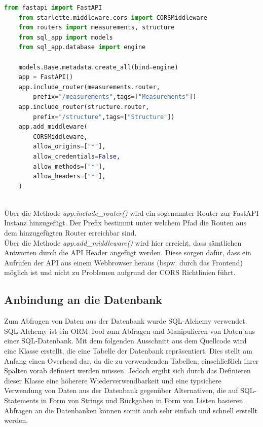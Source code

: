 \begin{lstlisting}[language={Python}, caption={Aufbau der API}, captionpos=b, label={fig:pythonAPI}]
    from fastapi import FastAPI
    from starlette.middleware.cors import CORSMiddleware
    from routers import measurements, structure
    from sql_app import models
    from sql_app.database import engine
    
    models.Base.metadata.create_all(bind=engine)
    app = FastAPI()
    app.include_router(measurements.router, 
        prefix="/measurements",tags=["Measurements"])
    app.include_router(structure.router, 
        prefix="/structure",tags=["Structure"])
    app.add_middleware(
        CORSMiddleware,
        allow_origins=["*"],
        allow_credentials=False,
        allow_methods=["*"],
        allow_headers=["*"],
    )
\end{lstlisting}~\\
Über die Methode \textit{app.include\_router()} wird ein sogenannter Router zur FastAPI Instanz 
hinzugefügt. 
Der Prefix bestimmt unter welchem Pfad die Routen aus dem hinzugefügten Router erreichbar sind. \\
Über die Methode \textit{app.add\_middleware()} wird hier erreicht, dass sämtlichen Antworten durch 
die API Header angefügt werden. Diese sorgen dafür, dass ein Aufrufen der API aus einem Webbrowser 
heraus (bspw. durch das Frontend) möglich ist und nicht zu Problemen aufgrund der 
CORS \cite{cors} Richtlinien führt. 

\subsection{Anbindung an die Datenbank}

Zum Abfragen von Daten aus der Datenbank wurde SQL-Alchemy verwendet. 
SQL-Alchemy ist ein ORM-Tool zum Abfragen und Manipulieren von Daten aus einer SQL-Datenbank. 
Mit dem folgenden Ausschnitt aus dem Quellcode wird eine Klasse erstellt, die eine Tabelle 
der Datenbank repräsentiert. Dies stellt am Anfang einen Overhead dar, da die zu verwendenden 
Tabellen, einschließlich ihrer Spalten vorab definiert werden müssen. Jedoch ergibt sich 
durch das Definieren dieser Klasse eine höherere Wiederverwendbarkeit und eine typsichere Verwendung 
von Daten aus der Datenbank gegenüber Alternativen, die auf SQL-Statements in Form von Strings und 
Rückgaben in Form von Listen basieren. Abfragen an die Datenbanken können somit auch sehr 
einfach und schnell erstellt werden. ~\\

